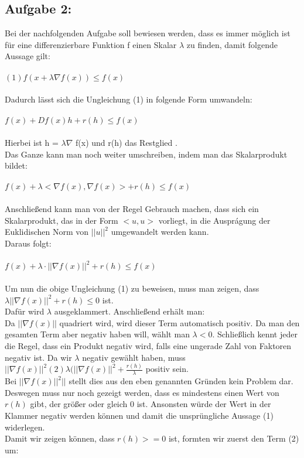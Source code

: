\documentclass{article}
\begin{document}
\begin{multicols}{2}
\subsection{Aufgabe 2:}
Bei der nachfolgenden Aufgabe soll bewiesen werden, dass es immer möglich ist für eine differenzierbare Funktion f einen Skalar $\lambda$ zu finden, damit folgende Aussage gilt: \\ \\
$(1) f(x + \lambda \nabla f(x)) \leq f(x)$ \\ \\
Dadurch lässt sich die Ungleichung (1) in folgende Form umwandeln: \\ \\
$f(x) + Df(x)h + r(h) \leq f(x)$  \\ \\
Hierbei ist h = $\lambda \nabla$ f(x) und r(h) das Restglied %
. \\
Das Ganze kann man noch weiter umschreiben, indem man das Skalarprodukt bildet: \\ \\
$f(x) + \lambda <\nabla f(x), \nabla f(x)> + r(h) \leq f(x)$ \\ \\
Anschließend kann man von der Regel Gebrauch machen, dass sich ein Skalarprodukt, das in der Form $<u,u>$ vorliegt, in die Auspr\'agung der Euklidischen Norm von $||u||^2$ umgewandelt werden kann. \\
Daraus folgt: \\ \\
$f(x) + \lambda \cdot || \nabla f(x)||^2 + r(h) \leq f(x)$ \\ \\
Um nun die obige Ungleichung (1) zu beweisen, muss man zeigen, dass \\ $\lambda ||\nabla f(x)||^2 + r(h) \leq 0$ ist.\\
Dafür wird $\lambda$ ausgeklammert. Anschließend erhält man:\\
Da $||\nabla f(x)||$ quadriert wird, wird dieser Term automatisch positiv. Da man den gesamten Term aber negativ haben will, wählt man $\lambda < 0.$ Schließlich kennt jeder die Regel, dass ein Produkt negativ wird, falls eine ungerade Zahl von Faktoren negativ ist. Da wir $\lambda$ negativ gewählt haben, muss \\ $||\nabla f(x)||^2$$(2) \lambda (||\nabla f(x)||^2 + \frac{r(h)}{\lambda}$ positiv sein.\\
Bei $||\nabla f(x)||^2||$ stellt dies aus den eben genannten Gr\"unden kein Problem dar. Deswegen muss nur noch gezeigt werden, dass es mindestens einen Wert von $r(h)$ gibt, der gr\"oßer oder gleich 0 ist. Ansonsten würde der Wert in der Klammer negativ werden k\"onnen und damit die unspr\"ungliche Aussage (1) widerlegen.\\
Damit wir zeigen k\"onnen, dass $r(h) >= 0$ ist, formten wir zuerst den Term (2) um:\\


\end{multicols}
\end{document}
